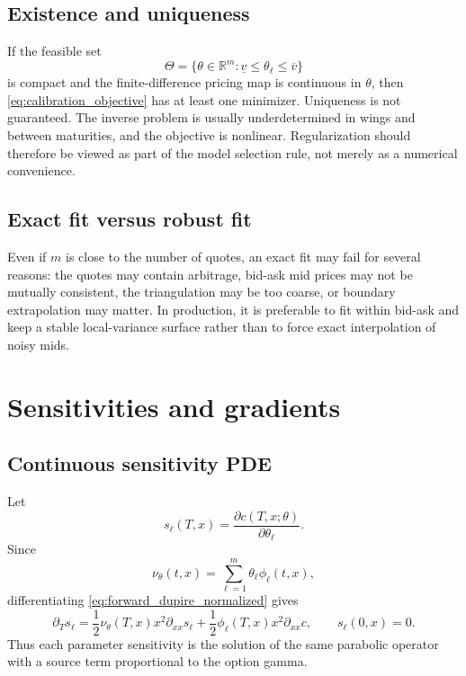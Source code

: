 \documentclass[11pt]{article}
\newcommand{\R}{\mathbb{R}}
\newcommand{\1}{\mathbf{1}}
\newcommand{\vloc}{\nu}
\begin{document}
\subsection{Existence and uniqueness}

If the feasible set
\[
  \Theta=\{\theta\in\R^m:\underline v\le\theta_\ell\le\overline v\}
\]
is compact and the finite-difference pricing map is continuous in $\theta$, then
\eqref{eq:calibration_objective} has at least one minimizer. Uniqueness is not guaranteed.
The inverse problem is usually underdetermined in wings and between maturities, and the
objective is nonlinear. Regularization should therefore be viewed as part of the model
selection rule, not merely as a numerical convenience.

\subsection{Exact fit versus robust fit}

Even if $m$ is close to the number of quotes, an exact fit may fail for several reasons:
the quotes may contain arbitrage, bid-ask mid prices may not be mutually consistent, the
triangulation may be too coarse, or boundary extrapolation may matter. In production, it
is preferable to fit within bid-ask and keep a stable local-variance surface rather than
to force exact interpolation of noisy mids.

\section{Sensitivities and gradients}

\subsection{Continuous sensitivity PDE}

Let
\[
  s_\ell(T,x)=\frac{\partial c(T,x;\theta)}{\partial\theta_\ell}.
\]
Since
\[
  \vloc_\theta(t,x)=\sum_{\ell=1}^m\theta_\ell\phi_\ell(t,x),
\]
differentiating \eqref{eq:forward_dupire_normalized} gives
\begin{equation}
  \partial_T s_\ell
  =
  \frac12\vloc_\theta(T,x)x^2\partial_{xx}s_\ell
  +
  \frac12\phi_\ell(T,x)x^2\partial_{xx}c,
  \qquad
  s_\ell(0,x)=0.
  \label{eq:sensitivity_pde}
\end{equation}
Thus each parameter sensitivity is the solution of the same parabolic operator with a
source term proportional to the option gamma.
\end{document}

